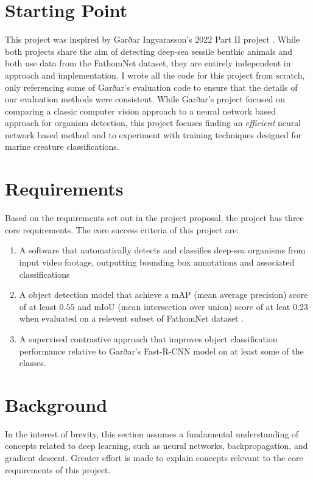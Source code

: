\documentclass[12pt,a4paper,twoside,openany]{report}
\begin{document}
\section{Starting Point}
This project was inspired by Garðar Ingvarasson's 2022 Part II project \cite{ingvarsson_deep-sea_2022}. While both projects share the aim of detecting deep-sea sessile benthic animals and both use data from the FathomNet \cite{katija_fathomnet_2022} dataset, they are entirely independent in approach and implementation. I wrote all the code for this project from scratch, only referencing some of Garðar's evaluation code to ensure that the details of our evaluation methods were consistent. While Garðar's project focused on comparing a classic computer vision approach to a neural network based approach for organism detection, this project focuses finding an \textit{efficient} neural network based method and to experiment with training techniques designed for marine creature classifications.

\section{Requirements}
 Based on the requirements set out in the project proposal, the project has three core requirements. The core success criteria of this project are:
\begin{enumerate}
    \item A software that automatically detects and classifies deep-sea organisms from input video footage, outputting bounding box annotations and associated classifications
    \item A object detection model that achieve a mAP (mean average precision) score of at least $0.55$ and mIoU (mean intersection over union) score of at leat $0.23$ when evaluated on a relevent subset of FathomNet dataset \cite{katija_fathomnet_2022}.
    \item A supervised contrastive approach that improves object classification performance relative to Garðar’s Fast-R-CNN model on at least some of the classes.
\end{enumerate}


\section{Background}
In the interest of brevity, this section assumes a fundamental understanding of concepts related to deep learning, such as neural networks, backpropagation, and gradient descent. Greater effort is made to explain concepts relevant to the core requirements of this project.
\end{document}
